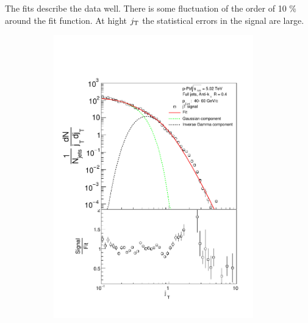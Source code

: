 The fits describe the data well. There is some fluctuation of the order of 10 \% around the fit function. At hight $j_{\rm T}$ the statistical errors in the signal are large.

\begin{figure}
\centering
\begin{subfigure}{0.24\textwidth}
\includegraphics[width=0.95\textwidth]{results/JetConejTSignalFit/JetConejTSignalFitNFin00JetPt04perconeBgBayes}

\end{subfigure}
\end{figure}
